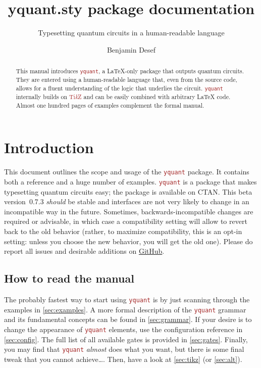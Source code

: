 \documentclass{scrartcl}
\title{yquant.sty package documentation}
\subtitle{Typesetting quantum circuits in a human-readable language}
\author{Benjamin Desef}
\makeatletter
\def\TikZ{\textcolor{brown}{Ti\textit kZ}}
\def\pkg#1{\textcolor{brown}{\texttt{#1}}}
\def\Yquant{\pkg{yquant}}
\newcommand*{\the@orig@section}{}
\let\the@orig@section=\section
\renewcommand*{\section}{%
   \clearpage%
   \the@orig@section%
}
\makeatother
\begin{document}
   \maketitle
   \begin{abstract}
      \noindent This manual introduces \Yquant, a \LaTeX\hyp only package that outputs quantum circuits.
      They are entered using a human\hyp readable language that, even from the source code, allows for a fluent understanding of the logic that underlies the circuit.
      \Yquant{} internally builds on \TikZ{} and can be easily combined with arbitrary \LaTeX{} code.
      Almost one hundred pages of examples complement the formal manual.
   \end{abstract}
   \tableofcontents

   \section{Introduction}
      This document outlines the scope and usage of the \Yquant{} package.
      It contains both a reference and a huge number of examples.
      \Yquant{} is a package that makes typesetting quantum circuits easy; the package is available on CTAN.
      This beta version~0.7.3 \emph{should} be stable and interfaces are not very likely to change in an incompatible way in the future.
      Sometimes, backwards\hyp incompatible changes are required or advisable, in which case a compatibility setting will allow to revert back to the old behavior (rather, to maximize compatibility, this is an opt\hyp in setting: unless you choose the new behavior, you will get the old one).
      Please do report all issues and desirable additions on \href{https://github.com/projekter/yquant/issues}{GitHub}.

      \subsection{How to read the manual}
         The probably fastest way to start using \Yquant{} is by just scanning through the examples in \cref{sec:examples}.
         A more formal description of the \Yquant{} grammar and its fundamental concepts can be found in \cref{sec:grammar}.
         If your desire is to change the appearance of \Yquant{} elements, use the configuration reference in \cref{sec:config}.
         The full list of all available gates is provided in \cref{sec:gates}.
         Finally, you may find that \Yquant{} \emph{almost} does what you want, but there is some final tweak that you cannot achieve\dots.
         Then, have a look at \cref{sec:tikz} (or \cref{sec:alt}).
\end{document}
